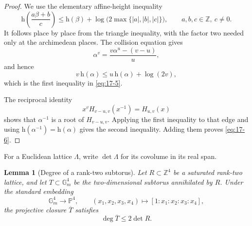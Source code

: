 \documentclass[11pt]{article}
\numberwithin{equation}{section}
\newtheorem{lemma}[theorem]{Lemma}
\theoremstyle{definition}
\newcommand{\Z}{\mathbb Z}
\begin{document}
\begin{proof}
We use the elementary affine-height inequality
\[
 \mathrm h\!\left(\frac{a\beta+b}{c}\right)
 \leq \mathrm h(\beta)
      +\log\!\bigl(2\max\{|a|,|b|,|c|\}\bigr),
 \qquad a,b,c\in\Z,\ c\neq0.
\]
It follows place by place from the triangle inequality, with the factor two
needed only at the archimedean places.  The collision equation gives
\[
 \alpha^v=\frac{v\alpha^u-(v-u)}u,
\]
and hence
\[
 v\,\mathrm h(\alpha)
 \leq u\,\mathrm h(\alpha)+\log(2v),
\]
which is the first inequality in \eqref{eq:17-5}.

The reciprocal identity
\[
 x^vH_{v-u,v}(x^{-1})=H_{u,v}(x)
\]
shows that \(\alpha^{-1}\) is a root of \(H_{v-u,v}\).  Applying the first
inequality to that edge and using
\(\mathrm h(\alpha^{-1})=\mathrm h(\alpha)\) gives the second inequality.
Adding them proves \eqref{eq:17-6}.
\end{proof}

For a Euclidean lattice \(\Lambda\), write \(\det\Lambda\) for its
covolume in its real span.

\begin{lemma}[Degree of a rank-two subtorus]\label{lem:toricdegree}
Let \(R\subset\Z^4\) be a saturated rank-two lattice, and let
\(T\subset\mathbb G_m^4\) be the two-dimensional subtorus annihilated by
\(R\).  Under the standard embedding
\[
 \mathbb G_m^4\longrightarrow\mathbb P^4,
 \qquad
 (x_1,x_2,x_3,x_4)\longmapsto[1:x_1:x_2:x_3:x_4],
\]
the projective closure \(\overline T\) satisfies
\begin{equation}
 \deg\overline T\leq2\det R.
 \label{eq:17-7}
\end{equation}
\end{lemma}
\end{document}
